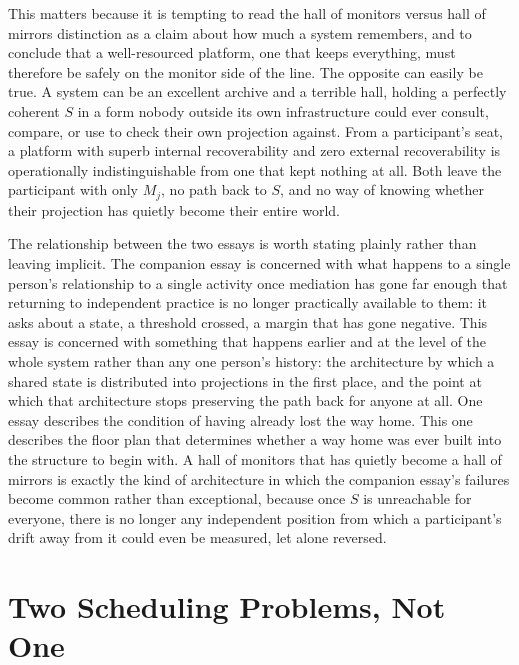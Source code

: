 \documentclass[12pt]{article}
\begin{document}
This matters because it is tempting to read the hall of monitors versus hall of mirrors distinction as a claim about how much a system remembers, and to conclude that a well-resourced platform, one that keeps everything, must therefore be safely on the monitor side of the line. The opposite can easily be true. A system can be an excellent archive and a terrible hall, holding a perfectly coherent $S$ in a form nobody outside its own infrastructure could ever consult, compare, or use to check their own projection against. From a participant's seat, a platform with superb internal recoverability and zero external recoverability is operationally indistinguishable from one that kept nothing at all. Both leave the participant with only $M_j$, no path back to $S$, and no way of knowing whether their projection has quietly become their entire world.

The relationship between the two essays is worth stating plainly rather than leaving implicit. The companion essay is concerned with what happens to a single person's relationship to a single activity once mediation has gone far enough that returning to independent practice is no longer practically available to them: it asks about a state, a threshold crossed, a margin that has gone negative. This essay is concerned with something that happens earlier and at the level of the whole system rather than any one person's history: the architecture by which a shared state is distributed into projections in the first place, and the point at which that architecture stops preserving the path back for anyone at all. One essay describes the condition of having already lost the way home. This one describes the floor plan that determines whether a way home was ever built into the structure to begin with. A hall of monitors that has quietly become a hall of mirrors is exactly the kind of architecture in which the companion essay's failures become common rather than exceptional, because once $S$ is unreachable for everyone, there is no longer any independent position from which a participant's drift away from it could even be measured, let alone reversed.

\section{Two Scheduling Problems, Not One}
\end{document}
